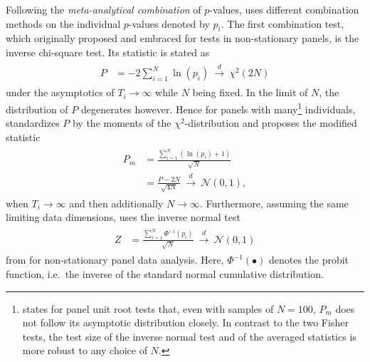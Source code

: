 Following the \textit{meta-analytical combination} of $p$-values, \citet{Choi2001} uses different combination methods on the individual $p$-values denoted by $ p_i $. The first combination test, which \citet{Fisher1932} originally proposed and \citet{MaddalaWu1999} embraced for tests in non-stationary panels, is the inverse chi-square test. Its statistic is stated as
\begin{align} \label{eq:Choi_P}
\begin{split}
	P & = - 2 \sum_{i=1}^{N} \ln\left( p_i \right) \ \overset{d}{\longrightarrow} \ \mathcal{\chi}^2(2N)  %
\end{split}
\end{align}
under the asymptotics of $ T_i \to \infty $ while $ N $ being fixed. In the limit of $ N $, the distribution of $ P $ degenerates however. Hence for panels with many\footnote{\citet[p.~268]{Choi2001} states for panel unit root tests that, even with samples of $N=100$, $P_m$ does not follow its asymptotic distribution closely. In contrast to the two Fisher tests, the test size of the inverse normal test and of the averaged statistics is more robust to any choice of $ N $.} individuals, \citet{Choi2001} standardizes $ P $ by the moments of the $ \chi^2 $-distribution and proposes the modified statistic
\begin{align} \label{eq:Choi_Pm}
\begin{split}
	P_m & = \frac{ \sum_{i=1}^{N} \left( \ln\left( p_i \right) + 1 \right) }{\sqrt{N}} \\ 
	& = \frac{P - 2N}{\sqrt{4N}} \ \overset{d}{\longrightarrow} \ \mathcal{N}(0,1), %
\end{split}
\end{align}
when $ T_i \to \infty $ and then additionally $ N \to \infty $. Furthermore, assuming the same limiting data dimensions, \citet{Choi2001} uses the inverse normal test
\begin{align} \label{eq:Choi_Z}
\begin{split}
	Z & = \frac{ \sum_{i=1}^{N} \Phi^{-1} \left( p_i \right) }{\sqrt{N}} \ \overset{d}{\longrightarrow} \ \mathcal{N}(0,1) %
\end{split}
\end{align}
from \citet{StouferEtAl1949} for non-stationary panel data analysis. Here, $\Phi^{-1} \left( \bullet \right) $ denotes the probit function, i.e.~the inverse of the standard normal cumulative distribution.


